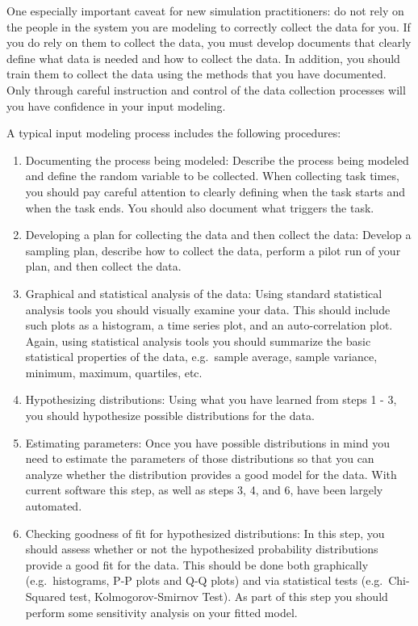 \documentclass[
]{book}
\theoremstyle{definition}
\theoremstyle{definition}
\theoremstyle{definition}
\theoremstyle{definition}
\theoremstyle{remark}
\begin{document}
One especially important caveat for new simulation practitioners: do not
rely on the people in the system you are modeling to correctly collect
the data for you. If you do rely on them to collect the data, you must
develop documents that clearly define what data is needed and how to
collect the data. In addition, you should train them to collect the data
using the methods that you have documented. Only through careful
instruction and control of the data collection processes will you have
confidence in your input modeling.

A typical input modeling process includes the following procedures:

\begin{enumerate}
\def\labelenumi{\arabic{enumi}.}
\item
  Documenting the process being modeled: Describe the process being
  modeled and define the random variable to be collected. When
  collecting task times, you should pay careful attention to clearly
  defining when the task starts and when the task ends. You should
  also document what triggers the task.
\item
  Developing a plan for collecting the data and then collect the data:
  Develop a sampling plan, describe how to collect the data, perform a
  pilot run of your plan, and then collect the data.
\item
  Graphical and statistical analysis of the data: Using standard
  statistical analysis tools you should visually examine your data.
  This should include such plots as a histogram, a time series plot,
  and an auto-correlation plot. Again, using statistical analysis
  tools you should summarize the basic statistical properties of the
  data, e.g.~sample average, sample variance, minimum, maximum,
  quartiles, etc.
\item
  Hypothesizing distributions: Using what you have learned from steps
  1 - 3, you should hypothesize possible distributions for the data.
\item
  Estimating parameters: Once you have possible distributions in mind
  you need to estimate the parameters of those distributions so that
  you can analyze whether the distribution provides a good model for
  the data. With current software this step, as well as steps 3, 4,
  and 6, have been largely automated.
\item
  Checking goodness of fit for hypothesized distributions: In this
  step, you should assess whether or not the hypothesized probability
  distributions provide a good fit for the data. This should be done
  both graphically (e.g.~histograms, P-P plots and Q-Q plots) and via
  statistical tests (e.g.~Chi-Squared test, Kolmogorov-Smirnov Test).
  As part of this step you should perform some sensitivity analysis on
  your fitted model.
\end{enumerate}
\end{document}
